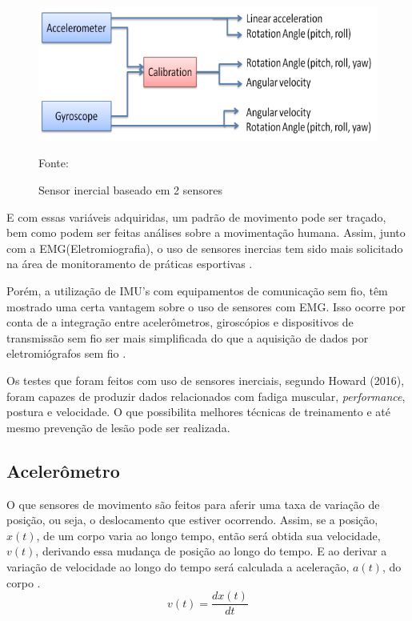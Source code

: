 		\begin{figure}[h]
			\centering
			\includegraphics[keepaspectratio=true,scale=0.3
			]{figuras/integracao_imu.png}
			\caption{Sensor inercial baseado em 2 sensores}
			Fonte: \cite{ahmad2013}
			\label{integracao_imu}
			
		\end{figure}

		E com essas variáveis adquiridas, um padrão de movimento pode ser traçado, bem como podem ser feitas análises sobre a movimentação humana. Assim, junto com a EMG(Eletromiografia), o uso de sensores inercias tem sido mais solicitado na área de monitoramento de práticas esportivas \cite{howard2016}.
		
		Porém, a utilização de IMU's com equipamentos de comunicação sem fio, têm mostrado uma certa vantagem sobre o uso de sensores com EMG. Isso ocorre por conta de a integração entre acelerômetros, giroscópios e dispositivos de transmissão sem fio ser mais simplificada do que a aquisição de dados por eletromiógrafos sem fio \cite{howard2016}. 
		
		Os testes que foram feitos com uso de sensores inerciais, segundo  Howard (2016), foram capazes de produzir dados relacionados com fadiga muscular, \textit{performance}, postura e velocidade. O que possibilita melhores técnicas de treinamento e até mesmo prevenção de lesão pode ser realizada.

			\subsection{Acelerômetro}
			
				O que sensores de movimento são feitos para aferir uma taxa de variação de posição, ou seja, o deslocamento que estiver ocorrendo. Assim, se a posição, $x(t)$, de um corpo varia ao longo tempo, então será obtida sua velocidade, $v(t)$,  derivando essa mudança de posição ao longo do tempo. E ao derivar a variação de velocidade ao longo do tempo será calculada a aceleração, $a(t)$, do corpo \cite{moyses2013}.
				\begin{equation}
				v(t) = \frac{dx(t)}{dt}
				\end{equation}
				
